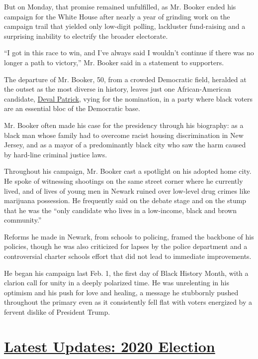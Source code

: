 But on Monday, that promise remained unfulfilled, as Mr. Booker ended
his campaign for the White House after nearly a year of grinding work on
the campaign trail that yielded only low-digit polling, lackluster
fund-raising and a surprising inability to electrify the broader
electorate.

``I got in this race to win, and I've always said I wouldn't continue if
there was no longer a path to victory,'' Mr. Booker said in a statement
to supporters.

The departure of Mr. Booker, 50, from a crowded Democratic field,
heralded at the outset as the most diverse in history, leaves just one
African-American candidate,
\href{https://www.nytimes.com/interactive/2020/us/elections/deval-patrick.html}{Deval
Patrick}, vying for the nomination, in a party where black voters are an
essential bloc of the Democratic base.

Mr. Booker often made his case for the presidency through his biography:
as a black man whose family had to overcome racist housing
discrimination in New Jersey, and as a mayor of a predominantly black
city who saw the harm caused by hard-line criminal justice laws.

Throughout his campaign, Mr. Booker cast a spotlight on his adopted home
city. He spoke of witnessing shootings on the same street corner where
he currently lived, and of lives of young men in Newark ruined over
low-level drug crimes like marijuana possession. He frequently said on
the debate stage and on the stump that he was the ``only candidate who
lives in a low-income, black and brown community.''

Reforms he made in Newark, from schools to policing, framed the backbone
of his policies, though he was also criticized for lapses by the police
department and a controversial charter schools effort that did not lead
to immediate improvements.

He began his campaign last Feb. 1, the first day of Black History Month,
with a clarion call for unity in a deeply polarized time. He was
unrelenting in his optimism and his push for love and healing, a message
he stubbornly pushed throughout the primary even as it consistently fell
flat with voters energized by a fervent dislike of President Trump.

\hypertarget{latest-updates-2020-election}{%
\section{\texorpdfstring{\href{https://www.nytimes.com/2020/07/31/us/elections/biden-vs-trump.html?action=click\&pgtype=Article\&state=default\&region=MAIN_CONTENT_1\&context=storylines_live_updates}{Latest
Updates: 2020
Election}}{Latest Updates: 2020 Election}}\label{latest-updates-2020-election}}

